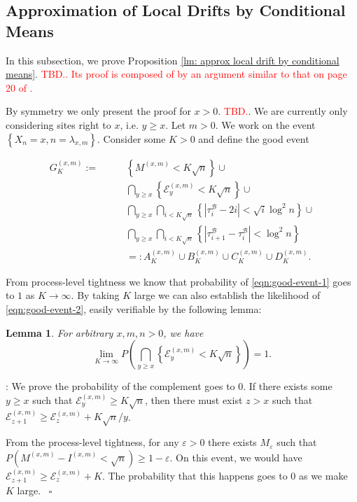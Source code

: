 \documentclass[twoside,12pt,a4paper]{article}
\newtheorem{lemma}{Lemma}[section]
\numberwithin{equation}{section}
\newenvironment{proof}{{\sc Proof}:}{~\hfill $\square$}
\newcommand\TBD{\textcolor{red}{TBD.}}
\begin{document}
{\subsection{Approximation of Local Drifts by Conditional Means}
In this subsection, we prove Proposition \ref{lm: approx local drift by conditional means}. \textcolor{red}{\TBD. Its proof is composed of by an argument similar to that on page 20 of \cite{KP16}.}

By symmetry we only present the proof for $x >  0$. \TBD. We are currently only considering sites right to $x$, i.e. $y \ge x$. Let $m > 0$.
We work on the event $\left\{ X_n = x, n = \lambda_{x, m} \right\} $. Consider some $K>0$ and define the good event

\begin{align}
	G_K^{(x,m)} :=  \qquad
		\label{eqn:good-event-1}
		& \left\{ M^{(x,m)}< K \sqrt{n}\right\} \cup  \\ 
		\label{eqn:good-event-2}
		& \bigcap_{y \ge x} \left\{\mathcal{E}_y^{(x,m)} < K \sqrt{ n} \right\}  \cup \\
		\label{eqn:good-event-3}
		& \bigcap_{y \ge x} \bigcap_{i < K \sqrt{n} } \left\{\left| \tau_i^{\mathcal{B}} - 2 i \right| < \sqrt{ i } \log^2 n \right\}  \cup \\
		\label{eqn:good-event-4}
		& \bigcap_{y \ge x} \bigcap_{i < K \sqrt{n} } \left\{\left| \tau_{i+1}^{\mathcal{B}} - \tau_i^{\mathcal{B}} \right| < \log^2 n \right\}  \\
		&=: A_K^{(x,m)} \cup B_{K}^{(x,m)} 
		\cup C_{K}^{(x,m)}
		\cup D_{K}^{(x,m)} 
.\end{align}

From process-level tightness we know that probability of \eqref{eqn:good-event-1} goes to $1$ as $K \to \infty $. By taking $K$ large we can also establish the likelihood of \eqref{eqn:good-event-2}, easily verifiable by the following lemma:

\begin{lemma}
	For arbitrary $x, m, n>0$, we have
	\[
		\lim_{K \to \infty} 
		P\left( \bigcap_{y \ge x} \left\{\mathcal{E}_y^{(x,m)} < K \sqrt{ n} \right\} \right) = 1
	.\] 
\end{lemma}
\begin{proof}
	We prove the probability of the complement goes to $0$. If there exists some $y \ge x$ such that $\mathcal{E}_y^{(x,m)} \ge  K \sqrt{n} $, then there must exist $z>x$ such that $\mathcal{E}_{z+1}^{(x,m)} \ge \mathcal{E}_{z}^{(x,m)} + K \sqrt{n} / y $.

	From the process-level tightness, for any $\varepsilon>0$ there exists $M_\varepsilon$ such that $P\left( M^{(x,m)} - I^{(x,m)} < \sqrt{n}  \right) \ge 1 - \varepsilon$. On this event, we would have $\mathcal{E}_{z+1}^{(x,m)} \ge \mathcal{E}_{z}^{(x,m)} + K$. The probability that this happens goes to $0$ as we make $K$ large.
\end{proof}

}
\end{document}
